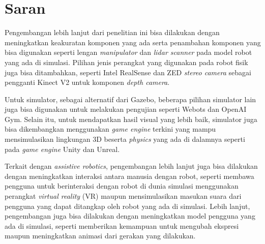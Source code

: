 \section{Saran}
\label{chap:saran}

Pengembangan lebih lanjut dari penelitian ini bisa dilakukan dengan meningkatkan keakuratan komponen yang ada serta penambahan komponen yang bisa digunakan seperti lengan \emph{manipulator} dan \emph{lidar scanner} pada model robot yang ada di simulasi.
Pilihan jenis perangkat yang digunakan pada robot fisik juga bisa ditambahkan,
  seperti Intel RealSense dan ZED \emph{stereo camera} sebagai pengganti Kinect V2 untuk komponen \emph{depth camera}.

Untuk simulator, sebagai alternatif dari Gazebo,
  beberapa pilihan simulator lain juga bisa digunakan untuk melakukan pengujian seperti Webots dan OpenAI Gym.
Selain itu, untuk mendapatkan hasil visual yang lebih baik,
  simulator juga bisa dikembangkan menggunakan \emph{game engine} terkini yang mampu mensimulasikan lingkungan 3D beserta \emph{physics} yang ada di dalamnya seperti pada \emph{game engine} Unity dan Unreal.

Terkait dengan \emph{assistive robotics},
  pengembangan lebih lanjut juga bisa dilakukan dengan meningkatkan interaksi antara manusia dengan robot,
  seperti membawa pengguna  untuk berinteraksi dengan robot di dunia simulasi menggunakan perangkat \emph{virtual reality} (VR) maupun mensimulasikan masukan suara dari pengguna yang dapat ditangkap oleh robot yang ada di simulasi.
Lebih lanjut, pengembangan juga bisa dilakukan dengan meningkatkan model pengguna yang ada di simulasi, seperti memberikan kemampuan untuk mengubah ekspresi maupun meningkatkan animasi dari gerakan yang dilakukan.
